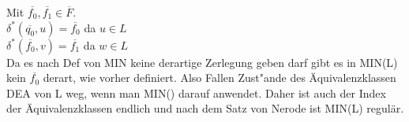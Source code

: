 \documentclass[12pt, a4paper]{article}
\begin{document}
Mit $\overline{f_0} , \overline{f_1} \in \overline{F}$.\\
$\delta^*(\overline{q_0}, u) = \overline{f_0}$ \hfill da $u \in L$ \\
$\delta^*(\overline{f_0}, v) = \overline{f_1}$ \hfill da $w \in L$ \\

Da es nach Def von MIN keine derartige Zerlegung geben darf gibt es in MIN(L) kein $\overline{f_0}$ derart, wie vorher definiert. Also Fallen Zust"ande des \"Aquivalenzklassen DEA von L weg, wenn man MIN() darauf anwendet. Daher ist auch der Index der \"Aquivalenzklassen endlich und nach dem Satz von Nerode ist MIN(L) regul\"ar. 
\end{document}
